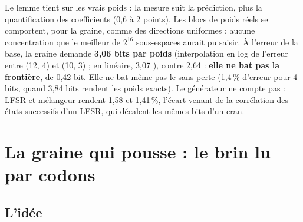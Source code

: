 Le lemme tient sur les vrais poids : la mesure suit la prédiction, plus la quantification des coefficients (0,6 à 2 points). Les blocs de poids réels se comportent, pour la graine, comme des directions uniformes : aucune concentration que le meilleur de $2^{16}$ sous-espaces aurait pu saisir. À l'erreur de la base, la graine demande \textbf{3,06 bits par poids} (interpolation en log de l'erreur entre (12, 4) et (10, 3) ; en linéaire, 3,07 \calc), contre 2,64 : \textbf{elle ne bat pas la frontière}, de 0,42 bit. Elle ne bat même pas le sans-perte (1,4\,\% d'erreur pour 4 bits, quand 3,84 bits rendent les poids exacts). Le générateur ne compte pas : LFSR et mélangeur rendent 1,58 et 1,41\,\%, l'écart venant de la corrélation des états successifs d'un LFSR, qui décalent les mêmes bits d'un cran.

\section{La graine qui pousse : le brin lu par codons}\label{t3gen:sec:brin}

\subsection{L'idée}


